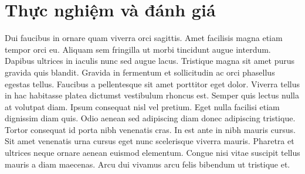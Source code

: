 \section{Thực nghiệm và đánh giá}
\label{chap:experiments}

Dui faucibus in ornare quam viverra orci sagittis. Amet facilisis magna etiam
tempor orci eu. Aliquam sem fringilla ut morbi tincidunt augue interdum.
Dapibus ultrices in iaculis nunc sed augue lacus. Tristique magna sit amet
purus gravida quis blandit. Gravida in fermentum et sollicitudin ac orci
phasellus egestas tellus. Faucibus a pellentesque sit amet porttitor eget
dolor. Viverra tellus in hac habitasse platea dictumst vestibulum rhoncus est.
Semper quis lectus nulla at volutpat diam. Ipsum consequat nisl vel pretium.
Eget nulla facilisi etiam dignissim diam quis. Odio aenean sed adipiscing diam
donec adipiscing tristique. Tortor consequat id porta nibh venenatis cras. In
est ante in nibh mauris cursus. Sit amet venenatis urna cursus eget nunc
scelerisque viverra mauris. Pharetra et ultrices neque ornare aenean euismod
elementum. Congue nisi vitae suscipit tellus mauris a diam maecenas. Arcu dui
vivamus arcu felis bibendum ut tristique et.